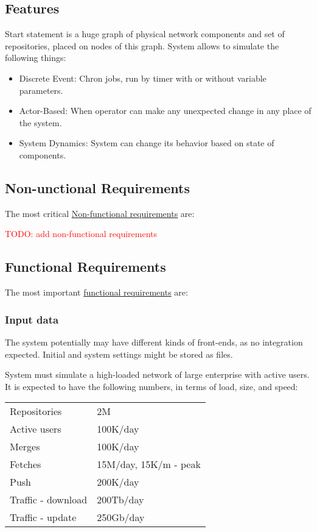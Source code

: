 \documentclass[12pt,oneside]{article}
\newcommand{\todo}[1]{\textcolor{red}{TODO: #1}}
\begin{document}
\subsection{Features}
\label{sec:features}
Start statement is a huge graph of physical network components and set of repositories, placed on nodes of this graph. System allows to simulate the following things:
\begin{itemize}
    \item Discrete Event: Chron jobs, run by timer with or without variable parameters.
    \item Actor-Based: When operator can make any unexpected change in any place of the system.
    \item System Dynamics: System can change its behavior based on state of components.
\end{itemize}

\subsection{Non-unctional Requirements}
\label{sec:nfr}
The most critical
\href{https://en.wikipedia.org/wiki/Non-functional_requirement}{Non-functional requirements}
are:

\todo{add non-functional requirements}

\subsection{Functional Requirements}
\label{sec:fr}

The most important \href{https://en.wikipedia.org/wiki/Functional_requirement}{functional requirements} are:

\subsubsection{Input data}
\label{sec:input}

The system potentially may have different kinds of front-ends, as no integration expected. Initial and system settings might be stored as files.
    
System must simulate a high-loaded network of large enterprise with active users. It is expected to have the following numbers, in terms of load, size, and speed:

\begin{tabular}{ll}
  Repositories & 2M \\
  Active users & 100K/day \\
  Merges & 100K/day \\
  Fetches & 15M/day, 15K/m - peak \\
  Push & 200K/day \\
  Traffic - download & 200Tb/day \\
  Traffic - update & 250Gb/day \\
\end{tabular}
\end{document}
